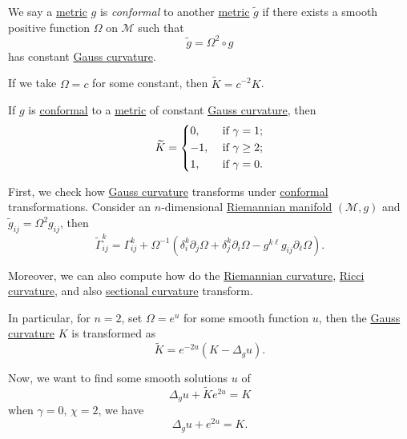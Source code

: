 \begin{definition}[Conformal]\label{def:conformal}
	We say a \hyperref[def:Riemannian-metric]{metric} \(g\) is \emph{conformal} to another \hyperref[def:Riemannian-metric]{metric} \(\widetilde{g} \) if there exists a smooth positive function \(\Omega \) on \(\mathcal{M} \) such that
	\[
		\widetilde{g} = \Omega ^2 \circ g
	\]
	has constant \hyperref[rmk:Gauss-curvature]{Gauss curvature}.
\end{definition}

\begin{note}
	If we take \(\Omega = c\) for some constant, then \(\widetilde{K} = c^{-2} K\).
\end{note}

\begin{theorem}\label{thm:uniformization}
	If \(g\) is \hyperref[def:conformal]{conformal} to a \hyperref[def:Riemannian-metric]{metric} of constant \hyperref[rmk:Gauss-curvature]{Gauss curvature}, then
	\[
		\widetilde{K} = \begin{dcases}
			0,  & \text{ if } \gamma = 1 ;    \\
			-1, & \text{ if } \gamma \geq 2 ; \\
			1 , & \text{ if } \gamma = 0.
		\end{dcases}
	\]
\end{theorem}

First, we check how \hyperref[rmk:Gauss-curvature]{Gauss curvature} transforms under \hyperref[def:conformal]{conformal} transformations. Consider an \(n\)-dimensional \hyperref[def:Riemannian-manifold]{Riemannian manifold} \((\mathcal{M} , g)\) and \(\widetilde{g} _{ij} = \Omega ^2 g_{ij}\), then
\[
	\widetilde{\Gamma} ^k_{ij} = \Gamma ^k_{ij} + \Omega ^{-1} (\delta _i^k \partial _j \Omega + \delta _j^k \partial _i \Omega - g^{k \ell } g_{ij} \partial _\ell \Omega ).
\]
\begin{remark}
	Moreover, we can also compute how do the \hyperref[def:Riemannian-curvature]{Riemannian curvature}, \hyperref[def:Ricci-curvature]{Ricci curvature}, and also \hyperref[def:sectional-curvature]{sectional curvature} transform.
\end{remark}

In particular, for \(n=2\), set \(\Omega = e^u\) for some smooth function \(u\), then the \hyperref[rmk:Gauss-curvature]{Gauss curvature} \(K\) is transformed as
\[
	\widetilde{K} = e^{-2u} (K - \Delta _g u).
\]

Now, we want to find some smooth solutions \(u\) of
\[
	\Delta _g u + \widetilde{K} e^{2u} = K
\]
when \(\gamma = 0\), \(\chi = 2\), we have
\[
	\Delta _g u + e^{2u} = K.
\]

